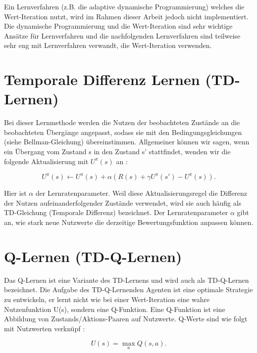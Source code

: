 Ein Lernverfahren (z.B. die adaptive dynamische Programmierung) welches die Wert-Iteration nutzt, wird im Rahmen dieser Arbeit jedoch nicht implementiert. Die dynamische Programmierung und die Wert-Iteration sind sehr wichtige Ansätze für Lernverfahren und die nachfolgenden Lernverfahren sind teilweise sehr eng mit Lernverfahren verwandt, die Wert-Iteration verwenden. \\

\section{Temporale Differenz Lernen (TD-Lernen)}
\label{sec:Temporale Differenz Lernen}
Bei dieser Lernmethode werden die Nutzen der beobachteten Zustände an die beobachteten Übergänge angepasst, sodass sie mit den Bedingungsgleichungen (siehe Bellman-Gleichung) übereinstimmen. Allgemeiner können wir sagen, wenn ein Übergang vom Zustand s in den Zustand s' stattfindet, wenden wir die folgende Aktualisierung mit $U^\pi(s)$ an \cite[966\psq]{Russell}:

\begin{equation}
\label{eq:Aktualisierungsgleichung temporale Differenz}
U^\pi(s) \leftarrow U^\pi(s) + \alpha(R(s) + \gamma U^\pi(s') - U^\pi(s)).
\end{equation}

Hier ist $\alpha$ der Lernratenparameter. Weil diese Aktualisierungsregel die Differenz der Nutzen aufeinanderfolgender Zustände verwendet, wird sie auch häufig als TD-Gleichung (Temporale Differenz) bezeichnet. Der Lernratenparameter $\alpha$ gibt an, wie stark neue Nutzwerte die derzeitige Bewertungsfunktion anpassen können. 

\section{Q-Lernen (TD-Q-Lernen)}
\label{sec:Q-Lernen}
Das Q-Lernen ist eine Variante des TD-Lernens und wird auch als TD-Q-Lernen bezeichnet. Die Aufgabe des TD-Q-Lernenden Agenten ist eine optimale Strategie zu entwickeln, er lernt nicht wie bei einer Wert-Iteration eine wahre Nutzenfunktion U(s), sondern eine Q-Funktion. Eine Q-Funktion ist eine Abbildung von Zustands/Aktions-Paaren auf Nutzwerte. Q-Werte sind wie folgt mit Nutzwerten verknüpf \cite[973]{Russell}:

\begin{equation}
\label{eq:Nutzenwerte und Q-Werte}
U(s) = \max_a Q(s,a).
\end{equation}


